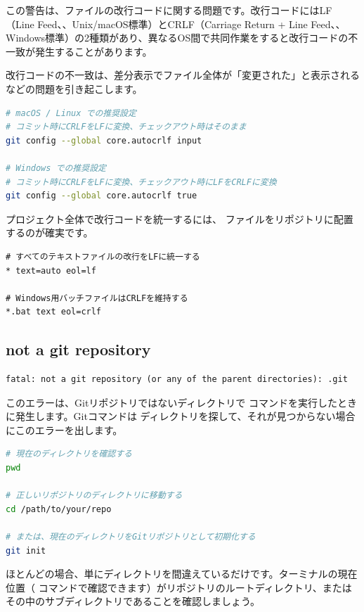 この警告は、ファイルの改行コードに関する問題です。改行コードにはLF（Line Feed、、Unix/macOS標準）とCRLF（Carriage Return + Line Feed、、Windows標準）の2種類があり、異なるOS間で共同作業をすると改行コードの不一致が発生することがあります。

改行コードの不一致は、差分表示でファイル全体が「変更された」と表示されるなどの問題を引き起こします。

\begin{lstlisting}[language=bash]
# macOS / Linux での推奨設定
# コミット時にCRLFをLFに変換、チェックアウト時はそのまま
git config --global core.autocrlf input

# Windows での推奨設定
# コミット時にCRLFをLFに変換、チェックアウト時にLFをCRLFに変換
git config --global core.autocrlf true
\end{lstlisting}

プロジェクト全体で改行コードを統一するには、 ファイルをリポジトリに配置するのが確実です。

\begin{lstlisting}[language={}]
# すべてのテキストファイルの改行をLFに統一する
* text=auto eol=lf

# Windows用バッチファイルはCRLFを維持する
*.bat text eol=crlf
\end{lstlisting}

\subsection{not a git repository}

\begin{lstlisting}[language={}]
fatal: not a git repository (or any of the parent directories): .git
\end{lstlisting}

このエラーは、Gitリポジトリではないディレクトリで  コマンドを実行したときに発生します。Gitコマンドは  ディレクトリを探して、それが見つからない場合にこのエラーを出します。

\begin{lstlisting}[language=bash]
# 現在のディレクトリを確認する
pwd

# 正しいリポジトリのディレクトリに移動する
cd /path/to/your/repo

# または、現在のディレクトリをGitリポジトリとして初期化する
git init
\end{lstlisting}

ほとんどの場合、単にディレクトリを間違えているだけです。ターミナルの現在位置（ コマンドで確認できます）がリポジトリのルートディレクトリ、またはその中のサブディレクトリであることを確認しましょう。

